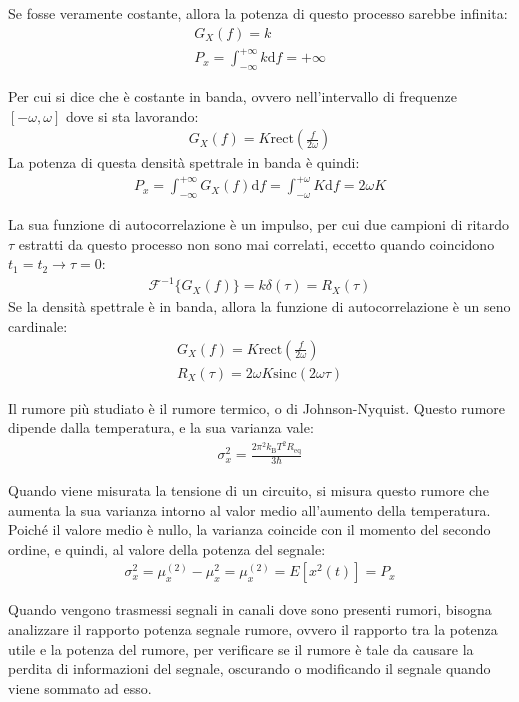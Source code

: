 \documentclass{article}
\newcommand{\rect}{\mathrm{rect}}
\newcommand{\sinc}{\mathrm{sinc}}
\newcommand{\df}{\mathrm{d}}
\numberwithin{equation}{subsection}
\begin{document}
Se fosse veramente costante, allora la potenza di questo processo sarebbe infinita:
\begin{gather*}
    G_X(f)=k\\
    P_x=\displaystyle\int_{-\infty}^{+\infty}k\df f=+\infty
\end{gather*}

Per cui si dice che è costante in banda, ovvero nell'intervallo di frequenze $[-\omega,\omega]$ dove si sta lavorando:
\begin{gather*}
    G_X(f)=\displaystyle K\rect\left(\frac{f}{2\omega}\right)
\end{gather*}
La potenza di questa densità spettrale in banda è quindi:
\begin{gather*}
    P_x=\displaystyle\int_{-\infty}^{+\infty}G_X(f)\df f=\int_{-\omega}^{+\omega}K\df f=2\omega K
\end{gather*}


La sua funzione di autocorrelazione è un impulso, per cui due campioni di ritardo $\tau$ estratti da questo processo non sono mai correlati, eccetto quando coincidono
$t_1=t_2\to \tau=0$:
\begin{gather*}
    \mathscr{F}^{-1}\{G_X(f)\}=k\delta(\tau)=R_X(\tau)
\end{gather*}
Se la densità spettrale è in banda, allora la funzione di autocorrelazione è un seno cardinale:
\begin{gather*}
    G_X(f)=\displaystyle K\rect\left(\frac{f}{2\omega}\right)\\
    R_X(\tau)=2\omega K\sinc(2\omega\tau)
\end{gather*}

Il rumore più studiato è il rumore termico, o di Johnson-Nyquist. Questo rumore dipende dalla temperatura, e la sua varianza vale:
\begin{gather*}
    \sigma_x^2=\displaystyle\frac{2\pi^2k_\mathrm{B}T^2R_\mathrm{eq}}{3\hbar}
\end{gather*}

Quando viene misurata la tensione di un circuito, si misura questo rumore che aumenta la sua varianza intorno al valor medio all'aumento della temperatura. 
Poiché il valore medio è nullo, la varianza coincide con il momento del secondo ordine, e quindi, al valore della potenza del segnale:
\begin{gather*}
    \sigma_x^2=\mu_x^{(2)}-\mu_x^2=\mu_x^{(2)}=E[x^2(t)]=P_x
\end{gather*}

Quando vengono trasmessi segnali in canali dove sono presenti rumori, bisogna analizzare il rapporto potenza segnale rumore, ovvero il rapporto tra la potenza utile e la 
potenza del rumore, per verificare se il rumore è tale da causare la perdita di informazioni del segnale, oscurando o modificando il segnale quando viene sommato ad esso. 
\end{document}
